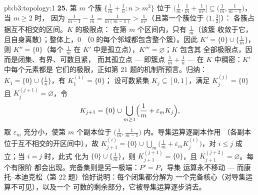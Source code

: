 \begin{solution}{pb:b3:topology:1}
\textbf{25.} 第 $m$ 个簇 $\{\frac1m + \frac1n : n >
m^2\}$ 位于 $\bigl(\frac1m, \frac1m + \frac1{m^2}\bigr]
\subseteq \bigl(\frac1m, \frac1{m-1}\bigr)$，当 $m \geq 2$ 时，
因为 $\frac1{m-1} - \frac1m = \frac1{m(m-1)} >
\frac1{m^2}$（且第一个簇位于 $(1, \frac32]$）：
各簇占据互不相交的区间。$K$ 的极限点：
在第 $m$ 个区间内，只有 $\frac1m$（该簇
收敛于它，且自身离散）；整体上，$0$
（$0$ 的每个邻域都包含整个簇）。因此 $K'
= \{0\} \cup \{\frac1m\}$，则 $K'' = \{0\}$（每个 $\frac1m$
在 $K'$ 中是孤立点），$K''' = \varnothing$；$K$ 包含其
全部极限点，因而是闭集、有界、可数且紧，
而其孤立点 --- 即簇点 $\frac1m +
\frac1n$ --- 在 $K$ 中稠密：$K'$ 中每个元素都是
它们的极限，正如第 21 题的机制所预言。归纳：
$K_1 = \{0\}\cup\{\frac1n\}$，有 $K_1^{(1)} = \{0\}$；
设可数紧集 $K_j \subseteq [0, 1]$，满足 $K_j^{(j)} =
\{0\}$ 且 $K_j^{(j+1)} = \varnothing$，令
\[
K_{j+1} = \{0\} \cup \bigcup_{m \geq 1}
\Bigl(\frac1m + \varepsilon_m K_j\Bigr),
\]
取 $\varepsilon_m$ 充分小，使第 $m$ 个副本位于
$\bigl(\frac1m, \frac1{m-1}\bigr)$ 内。导集运算逐副本作用
（各副本位于互不相交的开区间中），故
$K_{j+1}^{(i)} = \{0\} \cup \bigcup_m\bigl(\frac1m +
\varepsilon_mK_j^{(i)}\bigr)$，对 $i \leq j$ 成立；当 $i = j$ 时，此式
化为 $\{0\} \cup \{\frac1m\}$，则 $K_{j+1}^{(j+1)} =
\{0\}$，且 $K_{j+1}^{(j+2)} = \varnothing$。每个有限阶
都会出现。完备集则是另一极端：$P' = P$，导集
运算永不移动 --- 而康托–本迪克松（第
22 题）恰好说明：每个闭集都分解为
一个完备核心（对导集运算不可见），以及一个
可数的剩余部分，它被导集运算逐步消去。
\end{solution}
